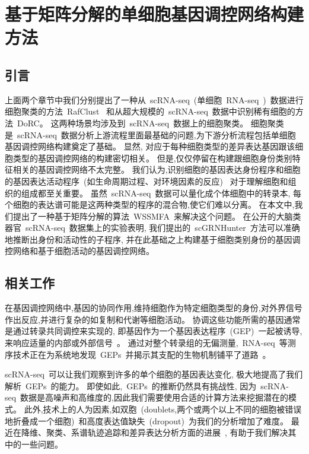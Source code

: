 \section{基于矩阵分解的单细胞基因调控网络构建方法}
\label{sec:scgrnhunter}

\subsection{引言}

上面两个章节中我们分别提出了一种从~scRNA-seq~(单细胞~RNA-seq~)~数据进行细胞聚类的方法~RafClust~
和从超大规模的~scRNA-seq~数据中识别稀有细胞的方法~DoRC。
这两种场景均涉及到~scRNA-seq~数据上的细胞聚类。
细胞聚类是~scRNA-seq~数据分析上游流程里面最基础的问题,为下游分析流程包括单细胞基因调控网络构建奠定了基础。
显然, 对应于每种细胞类型的差异表达基因跟该细胞类型的基因调控网络的构建密切相关。
但是,仅仅停留在构建跟细胞身份类别特征相关的基因调控网络不太完整。
我们认为,识别细胞的基因表达身份程序和细胞的基因表达活动程序~(如生命周期过程、对环境因素的反应)~
对于理解细胞和组织的组成都至关重要。
虽然~scRNA-seq~数据可以量化成个体细胞中的转录本,
每个细胞的表达谱可能是这两种类型的程序的混合物,使它们难以分离。
在本文中,我们提出了一种基于矩阵分解的算法~WSSMFA~来解决这个问题。
在公开的大脑类器官~scRNA-seq~数据集上的实验表明,
我们提出的~scGRNHunter~方法可以准确地推断出身份和活动性的子程序, 
并在此基础之上构建基于细胞类别身份的基因调控网络和基于细胞活动的基因调控网络。

\subsection{相关工作}
在基因调控网络中,基因的协同作用,维持细胞作为特定细胞类型的身份,对外界信号作出反应,并进行复杂的如复制和代谢等细胞活动。
协调这些功能所需的基因通常是通过转录共同调控来实现的,
即基因作为一个基因表达程序~(GEP)~一起被诱导,
来响应适量的内部或外部信号~\cite{eisen1998cluster,segal2003module}。
通过对整个转录组的无偏测量,~RNA-seq~等测序技术正在为系统地发现~GEPs~并揭示其支配的生物机制铺平了道路~\cite{liberzon2015molecular}。

scRNA-seq~可以让我们观察到许多的单个细胞的基因表达变化,
极大地提高了我们解析~GEPs~的能力。
即使如此,~GEPs~的推断仍然具有挑战性,
因为~scRNA-seq~数据是高噪声和高维度的,因此我们需要使用合适的计算方法来挖掘潜在的模式。
此外,技术上的人为因素,如双胞~(doublets,两个或两个以上不同的细胞被错误地折叠成一个细胞)~和高度表达值缺失~(dropout)~为我们的分析增加了难度。
最近在降维、聚类、系谱轨迹追踪和差异表达分析方面的进展~\cite{amir2013visne,kharchenko2014bayesian,satija2015spatial,trapnell2014dynamics},
有助于我们解决其中的一些问题。

